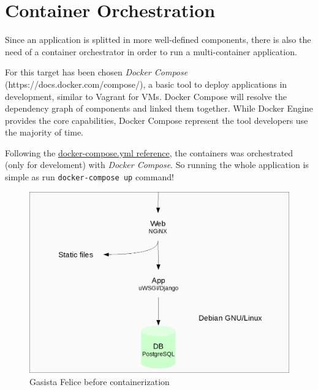 \section{Container Orchestration}\label{container-orchestration}

Since an application is splitted in more well-defined components, there
is also the need of a container orchestrator in order to run a multi-container application.

For this target has been chosen \emph{Docker Compose}
(https://docs.docker.com/compose/), a basic tool to deploy applications
in development, similar to Vagrant for VMs. Docker Compose will resolve
the dependency graph of components and linked them together. While
Docker Engine provides the core capabilities, Docker Compose represent
the tool developers use the majority of time.

Following the \href{https://docs.docker.com/compose/yml/}{docker-compose.yml reference}, the containers was orchestrated
(only for develoment) with \emph{Docker Compose}. So running the whole
application is simple as run \texttt{docker-compose\ up} command!

\begin{figure}[htbp]
\centering
\includegraphics{media/ch3-gf_old.png}
\caption{Gasista Felice before containerization}
\end{figure}

